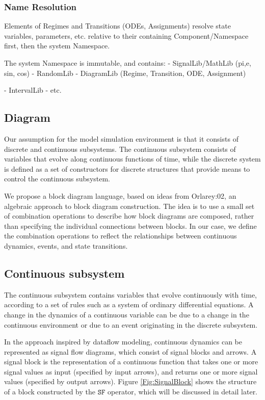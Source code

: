 \documentclass[a4paper]{article}
\begin{document}
\subsubsection{Name Resolution}

Elements of Regimes and Transitions (ODEs, Assignments) resolve state
variables, parameters, etc. relative to their containing
Component/Namespace first, then the system Namespace.

The system Namespace is immutable, and contains:
- SignalLib/MathLib (pi,e, sin, cos)
- RandomLib
- DiagramLib (Regime, Transition, ODE, Assignment)

- IntervalLib
- etc.



\subsection{Diagram}

Our assumption for the model simulation environment is that it
consists of discrete and continuous subsystems. The continuous
subsystem consists of variables that evolve along continuous functions
of time, while the discrete system is defined as a set of constructors
for discrete structures that provide means to control the continuous
subsystem. 

We propose a block diagram language, based on ideas from
Orlarey:02, an algebraic approach to block diagram
construction. The idea is to use a small set of combination operations
to describe how block diagrams are composed, rather than specifying
the individual connections between blocks. In our case, we define the
combination operations to reflect the relationships between continuous
dynamics, events, and state transitions.

\subsection{Continuous subsystem}

The continuous subsystem contains variables that evolve
continuously with time, according to a set of rules such as a system
of ordinary differential equations. A change in the dynamics of a
continuous variable can be due to a change in the continuous
environment or due to an event originating in the discrete
subsystem. 

In the approach inspired by dataflow modeling, continuous dynamics
can be represented as signal flow diagrams, which consist of signal
blocks and arrows. A signal block is the representation of a
continuous function that takes one or more signal values as
input (specified by input arrows), and returns one or more signal
values (specified by output arrows).
Figure \ref{Fig:SignalBlock} shows the structure of a block
constructed by the $\texttt{SF}$ operator, which will be discussed
in detail later. 
\end{document}
